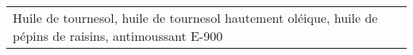 \begin{tabular}{p{7cm}p{7cm}}
                                                                                                                                                                                                                                                                                                                                                                     Huile de tournesol, huile de tournesol hautement oléique, huile de pépins de raisins, antimoussant E-900 &                                                                                                                                                                                                                                                                                                                                                                                                                                                                                                                                                                                                                                                                                                                                                                                                                                                                                                                                                                                                                                                                                                                                                                                                                                                                                                                                                                                                                                        \\

\end{tabular}
